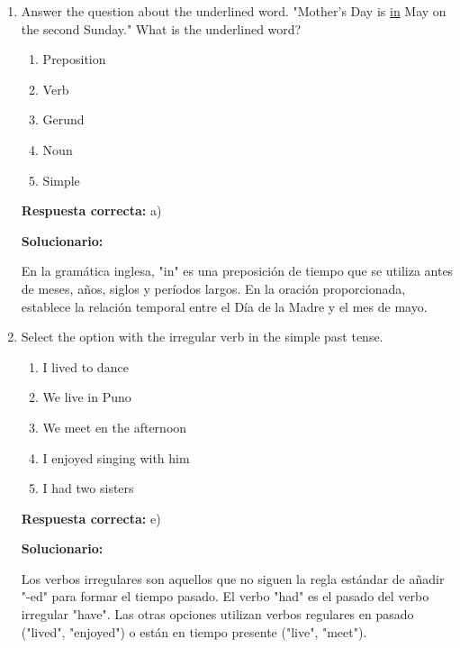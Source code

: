 \begin{enumerate}[resume]

	\item Answer the question about the underlined word.
	"Mother's Day is \underline{in} May on the second Sunday."
	What is the underlined word?
	
	\begin{enumerate}[label=\alph*)]
		\item Preposition
		\item Verb
		\item Gerund
		\item Noun
		\item Simple
	\end{enumerate}
	
	\textbf{Respuesta correcta:} a)
	
	\vspace{2mm}
	\textbf{Solucionario:}
	
	En la gramática inglesa, "in" es una preposición de tiempo que se utiliza antes de meses, años, siglos y períodos largos. En la oración proporcionada, establece la relación temporal entre el Día de la Madre y el mes de mayo.
	
	\vspace{6mm}
	
	\item Select the option with the irregular verb in the simple past tense.
	
	\begin{enumerate}[label=\alph*)]
		\item I lived to dance
		\item We live in Puno
		\item We meet en the afternoon
		\item I enjoyed singing with him
		\item I had two sisters
	\end{enumerate}
	
	\textbf{Respuesta correcta:} e)
	
	\vspace{2mm}
	\textbf{Solucionario:}
	
	Los verbos irregulares son aquellos que no siguen la regla estándar de añadir "-ed" para formar el tiempo pasado. El verbo "had" es el pasado del verbo irregular "have". Las otras opciones utilizan verbos regulares en pasado ("lived", "enjoyed") o están en tiempo presente ("live", "meet").
	
	\vspace{6mm}
	
\end{enumerate}





